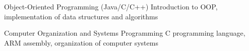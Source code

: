 

\begin{cvskills}

  \cvskill
    {Object-Oriented Programming (Java/C/C++)} %
    {Introduction to OOP, implementation of data structures and algorithms} %
    
  
  \cvskill
    {Computer Organization and Systems Programming} %
    {C programming language, ARM assembly, organization of computer systems} %


\end{cvskills}

